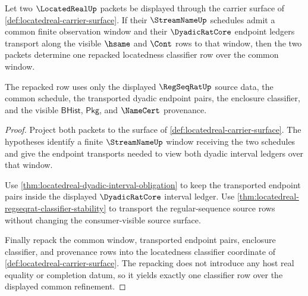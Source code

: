 \begin{theorem}
\label{thm:locatedreal-common-refinement-gluing}
Let two $\LocatedRealUp$ packets be displayed through the carrier surface of \autoref{def:locatedreal-carrier-surface}. If their $\StreamNameUp$ schedules admit a common finite observation window and their $\DyadicRatCore$ endpoint ledgers transport along the visible $\hsame$ and $\Cont$ rows to that window, then the two packets determine one repacked locatedness classifier row over the common window.

The repacked row uses only the displayed $\RegSeqRatUp$ source data, the common schedule, the transported dyadic endpoint pairs, the enclosure classifier, and the visible $\mathsf{BHist}$, $\mathsf{Pkg}$, and $\NameCert$ provenance.
\end{theorem}
\begin{proof}
Project both packets to the surface of \autoref{def:locatedreal-carrier-surface}. The hypotheses identify a finite $\StreamNameUp$ window receiving the two schedules and give the endpoint transports needed to view both dyadic interval ledgers over that window.

Use \autoref{thm:locatedreal-dyadic-interval-obligation} to keep the transported endpoint pairs inside the displayed $\DyadicRatCore$ interval ledger. Use \autoref{thm:locatedreal-regseqrat-classifier-stability} to transport the regular-sequence source rows without changing the consumer-visible source surface.

Finally repack the common window, transported endpoint pairs, enclosure classifier, and provenance rows into the locatedness classifier coordinate of \autoref{def:locatedreal-carrier-surface}. The repacking does not introduce any host real equality or completion datum, so it yields exactly one classifier row over the displayed common refinement.
\end{proof}

